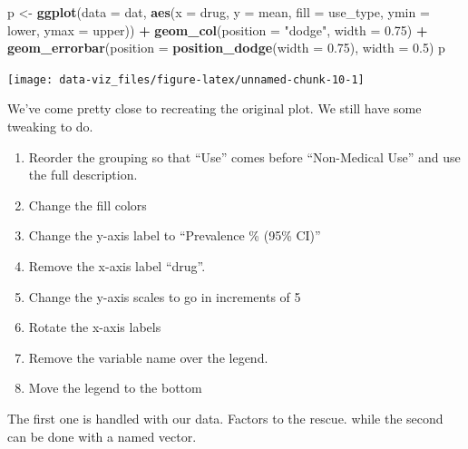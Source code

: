 \documentclass[]{book}
\newenvironment{Shaded}{\begin{snugshade}}{\end{snugshade}}
\newcommand{\DataTypeTok}[1]{\textcolor[rgb]{0.13,0.29,0.53}{#1}}
\newcommand{\FloatTok}[1]{\textcolor[rgb]{0.00,0.00,0.81}{#1}}
\newcommand{\KeywordTok}[1]{\textcolor[rgb]{0.13,0.29,0.53}{\textbf{#1}}}
\newcommand{\NormalTok}[1]{#1}
\newcommand{\OperatorTok}[1]{\textcolor[rgb]{0.81,0.36,0.00}{\textbf{#1}}}
\newcommand{\StringTok}[1]{\textcolor[rgb]{0.31,0.60,0.02}{#1}}
\providecommand{\tightlist}{%
  \setlength{\itemsep}{0pt}\setlength{\parskip}{0pt}}
\theoremstyle{definition}
\theoremstyle{definition}
\theoremstyle{definition}
\theoremstyle{remark}
\begin{document}
\begin{Shaded}
\begin{Highlighting}[]
\NormalTok{p <-}\StringTok{ }\KeywordTok{ggplot}\NormalTok{(}\DataTypeTok{data =}\NormalTok{ dat, }\KeywordTok{aes}\NormalTok{(}\DataTypeTok{x =}\NormalTok{ drug, }\DataTypeTok{y =}\NormalTok{ mean, }\DataTypeTok{fill =}\NormalTok{ use_type, }\DataTypeTok{ymin =}\NormalTok{ lower, }\DataTypeTok{ymax =}\NormalTok{ upper)) }\OperatorTok{+}
\StringTok{  }\KeywordTok{geom_col}\NormalTok{(}\DataTypeTok{position =} \StringTok{"dodge"}\NormalTok{, }\DataTypeTok{width =} \FloatTok{0.75}\NormalTok{) }\OperatorTok{+}
\StringTok{  }\KeywordTok{geom_errorbar}\NormalTok{(}\DataTypeTok{position =} \KeywordTok{position_dodge}\NormalTok{(}\DataTypeTok{width =} \FloatTok{0.75}\NormalTok{), }\DataTypeTok{width =} \FloatTok{0.5}\NormalTok{)}
\NormalTok{p}
\end{Highlighting}
\end{Shaded}

\begin{center}\texttt{[image: data-viz\_files/figure-latex/unnamed-chunk-10-1]} \end{center}

We've come pretty close to recreating the original plot. We still have
some tweaking to do.

\begin{enumerate}
\def\labelenumi{\arabic{enumi}.}
\tightlist
\item
  Reorder the grouping so that ``Use'' comes before ``Non-Medical Use''
  and use the full description.
\item
  Change the fill colors
\item
  Change the y-axis label to ``Prevalence \% (95\% CI)''
\item
  Remove the x-axis label ``drug''.
\item
  Change the y-axis scales to go in increments of 5
\item
  Rotate the x-axis labels
\item
  Remove the variable name over the legend.
\item
  Move the legend to the bottom
\end{enumerate}

The first one is handled with our data. Factors to the rescue. while the
second can be done with a named vector.
\end{document}
